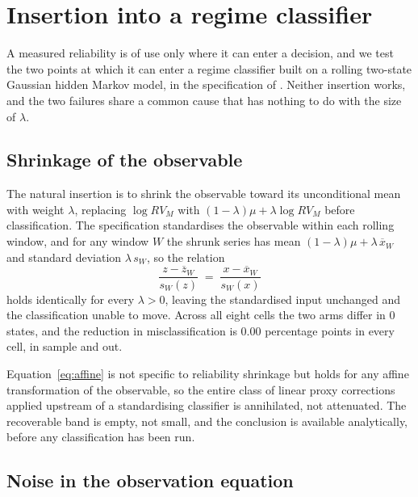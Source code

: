 \section{Insertion into a regime classifier}\label{sec:insertion}

A measured reliability is of use only where it can enter a decision, and we test
the two points at which it can enter a regime classifier built on a rolling
two-state Gaussian hidden Markov model, in the specification of \citet{blake2025}. Neither
insertion works, and the two failures share a common cause that has nothing to do
with the size of $\lambda$.

\subsection{Shrinkage of the observable}

The natural insertion is to shrink the observable toward its unconditional mean
with weight $\lambda$, replacing $\log RV_M$ with
$(1-\lambda)\mu + \lambda \log RV_M$ before classification. The specification
standardises the observable within each rolling window, and for any window $W$
the shrunk series has mean $(1-\lambda)\mu + \lambda\,\overline{x}_W$ and
standard deviation $\lambda\, s_W$, so the relation
\begin{equation}\label{eq:affine}
\frac{z - \overline{z}_W}{s_W(z)} \;=\; \frac{x - \overline{x}_W}{s_W(x)}
\end{equation}
holds identically for every $\lambda > 0$, leaving the standardised input
unchanged and the classification unable to move. Across all eight cells the two
arms differ in $0$ states, and the reduction in misclassification is $0.00$ %
percentage points in every cell, in sample and out. %

Equation~\eqref{eq:affine} is not specific to reliability shrinkage but holds for
any affine transformation of the observable, so the entire class of linear proxy
corrections applied upstream of a standardising classifier is annihilated, not
attenuated. The recoverable band is empty, not small, and the conclusion is
available analytically, before any classification has been run.

\subsection{Noise in the observation equation}

